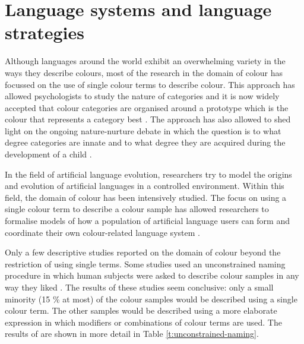\chapter{Language systems and language strategies}

Although languages around the world exhibit an overwhelming variety in
the ways they describe colours, most of the research in the domain of
colour has focussed on the use of single colour terms to describe
colour. This approach has allowed psychologists to study the nature of
categories and it is now widely accepted that colour categories are organised around a
prototype which is the colour that represents a category best
\citep{rosch73natural}. The approach has also allowed to shed light
on the ongoing nature-nurture debate in which the question is to what
degree categories are innate and to what degree they are acquired
during the development of a child \citep{berlin69basic}.

In the field of artificial language evolution, researchers try to
model the origins and evolution of artificial languages in a
controlled environment. Within this field, the domain of colour has
been intensively studied. The focus on using a single colour term to
describe a colour sample has allowed researchers to formalise models
of how a population of artificial language users can form and
coordinate their own colour-related language system
\citep{steels05coordinating, belpaeme05explaining, belpaeme07language,
  puglisi08cultural, baronchelli10modeling}.

Only a few descriptive studies reported on the domain of colour beyond
the restriction of using single terms. Some studies used an
unconstrained naming procedure in which human subjects were asked to
describe colour samples in any way they liked \citep{simpson91sex,
  lin01unconstrained}. The results of these studies seem conclusive:
only a small minority (15 \% at most) of the colour samples would be
described using a single colour term. The other samples would be
described using a more elaborate expression in which modifiers or
combinations of colour terms are used. The results of
\citet{lin01unconstrained} are shown in more detail in Table
\ref{t:unconstrained-naming}.

